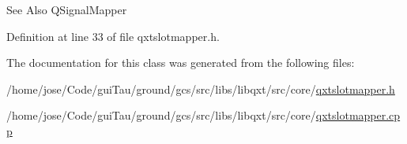 \begin{DoxySeeAlso}{See Also}
Q\-Signal\-Mapper 
\end{DoxySeeAlso}


Definition at line 33 of file qxtslotmapper.\-h.



The documentation for this class was generated from the following files\-:\begin{DoxyCompactItemize}
\item 
/home/jose/\-Code/gui\-Tau/ground/gcs/src/libs/libqxt/src/core/\hyperlink{qxtslotmapper_8h}{qxtslotmapper.\-h}\item 
/home/jose/\-Code/gui\-Tau/ground/gcs/src/libs/libqxt/src/core/\hyperlink{qxtslotmapper_8cpp}{qxtslotmapper.\-cpp}\end{DoxyCompactItemize}
